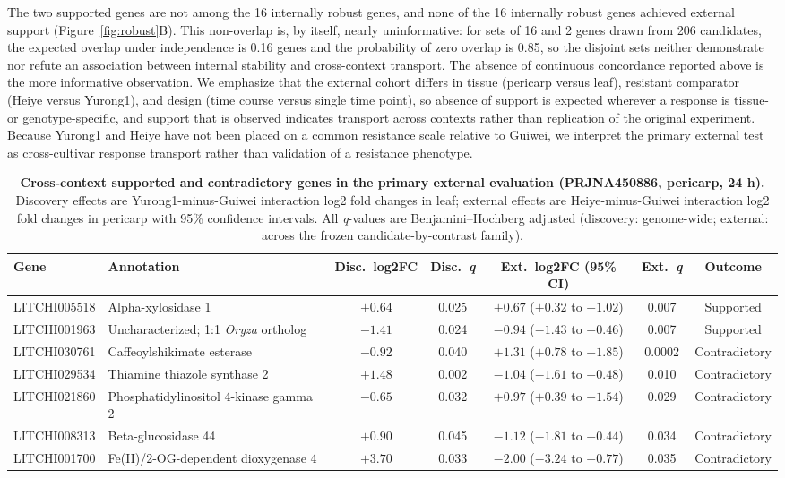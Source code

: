 \documentclass[11pt]{article}
\newcommand{\q}{\textit{q}}
\begin{document}
The two supported genes are not among the 16 internally robust genes, and none of the 16 internally robust genes achieved external support (Figure~\ref{fig:robust}B). This non-overlap is, by itself, nearly uninformative: for sets of 16 and 2 genes drawn from 206 candidates, the expected overlap under independence is 0.16 genes and the probability of zero overlap is 0.85, so the disjoint sets neither demonstrate nor refute an association between internal stability and cross-context transport. The absence of continuous concordance reported above is the more informative observation. We emphasize that the external cohort differs in tissue (pericarp versus leaf), resistant comparator (Heiye versus Yurong1), and design (time course versus single time point), so absence of support is expected wherever a response is tissue- or genotype-specific, and support that is observed indicates transport across contexts rather than replication of the original experiment. Because Yurong1 and Heiye have not been placed on a common resistance scale relative to Guiwei, we interpret the primary external test as cross-cultivar response transport rather than validation of a resistance phenotype.

\begin{table}[p]
\centering
\caption{\textbf{Cross-context supported and contradictory genes in the primary external evaluation (PRJNA450886, pericarp, 24 h).} Discovery effects are Yurong1-minus-Guiwei interaction log2 fold changes in leaf; external effects are Heiye-minus-Guiwei interaction log2 fold changes in pericarp with 95\% confidence intervals. All \q-values are Benjamini--Hochberg adjusted (discovery: genome-wide; external: across the frozen candidate-by-contrast family).}
\label{tab:external}
\footnotesize
\setlength{\tabcolsep}{2.4pt}
\begin{tabular}{@{}llccccc@{}}
\toprule
\textbf{Gene} & \textbf{Annotation} & \textbf{Disc.\ log2FC} & \textbf{Disc.\ \q} & \textbf{Ext.\ log2FC (95\% CI)} & \textbf{Ext.\ \q} & \textbf{Outcome} \\
\midrule
LITCHI005518 & Alpha-xylosidase 1 & $+0.64$ & 0.025 & $+0.67$ ($+0.32$ to $+1.02$) & 0.007 & Supported \\
LITCHI001963 & Uncharacterized; 1:1 \textit{Oryza} ortholog & $-1.41$ & 0.024 & $-0.94$ ($-1.43$ to $-0.46$) & 0.007 & Supported \\
LITCHI030761 & Caffeoylshikimate esterase & $-0.92$ & 0.040 & $+1.31$ ($+0.78$ to $+1.85$) & 0.0002 & Contradictory \\
LITCHI029534 & Thiamine thiazole synthase 2 & $+1.48$ & 0.002 & $-1.04$ ($-1.61$ to $-0.48$) & 0.010 & Contradictory \\
LITCHI021860 & Phosphatidylinositol 4-kinase gamma 2 & $-0.65$ & 0.032 & $+0.97$ ($+0.39$ to $+1.54$) & 0.029 & Contradictory \\
LITCHI008313 & Beta-glucosidase 44 & $+0.90$ & 0.045 & $-1.12$ ($-1.81$ to $-0.44$) & 0.034 & Contradictory \\
LITCHI001700 & Fe(II)/2-OG-dependent dioxygenase 4 & $+3.70$ & 0.033 & $-2.00$ ($-3.24$ to $-0.77$) & 0.035 & Contradictory \\
\bottomrule
\end{tabular}
\end{table}
\end{document}
